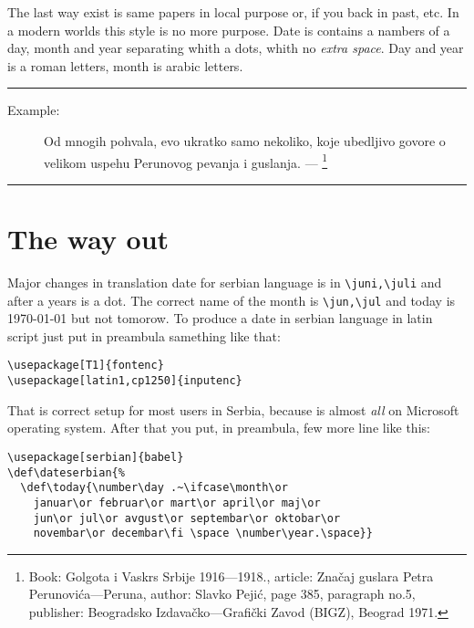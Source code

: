 \documentclass[a4paper,12pt]{article}
\begin{document}
The last way exist is same papers in local purpose or, if you back in past, etc. In a 
modern worlds this style is no more purpose. Date is contains a nambers of a day, 
month and year separating whith a dots, whith no \textit{extra space}. Day and year is a 
roman letters, month is arabic letters. 

\bigskip
\hrule

\begin{description}
\item[Example:] Od mnogih pohvala, evo ukratko samo nekoliko, koje ubedljivo 
govore o velikom uspehu Perunovog pevanja i guslanja.  --- \footnote{Book: Golgota i Vaskrs Srbije 1916---1918., article: Zna\v{c}aj 
guslara Petra Perunovi\'{c}a---Peruna, author: Slavko Peji\'{c}, page 385, 
paragraph no.5, publisher: Beogradsko Izdava\v{c}ko---Grafi\v{c}ki Zavod (BIGZ), 
Beograd 1971.} 
\end{description}

\hrule
\bigskip

\section{The way out}

Major changes in translation date for serbian language is in \verb|\juni,\juli| and 
after a years is a dot. The correct name of the month is \verb|\jun,\jul| and today 
is \today {} but not tomorow.
To produce a date in serbian language in latin script just put 
in preambula samething like that:

\begin{verbatim}
\usepackage[T1]{fontenc}
\usepackage[latin1,cp1250]{inputenc}
\end{verbatim}

That is correct setup for most users in Serbia, because is almost \textit{all}
on Microsoft operating system. After that you put, in preambula, few more 
line like this:

\begin{verbatim}
\usepackage[serbian]{babel}
\def\dateserbian{%
  \def\today{\number\day .~\ifcase\month\or
    januar\or februar\or mart\or april\or maj\or
    jun\or jul\or avgust\or septembar\or oktobar\or 
    novembar\or decembar\fi \space \number\year.\space}}
\end{verbatim}
\end{document}
